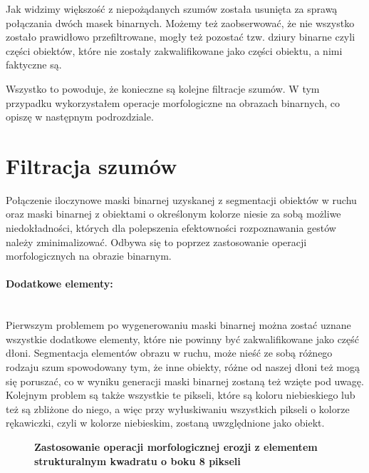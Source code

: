 \documentclass[a4paper,12pt,twoside,openany]{report}
\newcommand{\ImgPath}{.}
\begin{document}
Jak widzimy większość z niepożądanych szumów została usunięta za sprawą połączania dwóch masek binarnych. Możemy też zaobserwować, że nie wszystko zostało prawidłowo przefiltrowane, mogły też pozostać tzw. dziury binarne czyli części obiektów, które nie zostały zakwalifikowane jako części obiektu, a nimi faktyczne są. 

Wszystko to powoduje, że konieczne są kolejne filtracje szumów. W tym przypadku wykorzystałem operacje morfologiczne na obrazach binarnych, co opiszę w następnym podrozdziale.  

\section{Filtracja szumów}
Połączenie iloczynowe maski binarnej uzyskanej z segmentacji obiektów w ruchu oraz maski binarnej z obiektami o określonym kolorze niesie za sobą możliwe niedokładności, których dla polepszenia efektowności rozpoznawania gestów należy zminimalizować. Odbywa się to poprzez zastosowanie operacji morfologicznych na obrazie binarnym. 

\paragraph{Dodatkowe elementy:} \mbox{} \\
Pierwszym problemem po wygenerowaniu maski binarnej można zostać uznane wszystkie dodatkowe elementy, które nie powinny być zakwalifikowane jako część dłoni. Segmentacja elementów obrazu w ruchu, może nieść ze sobą różnego rodzaju szum spowodowany tym, że inne obiekty, różne od naszej dłoni też mogą się poruszać, co w wyniku generacji maski binarnej zostaną też wzięte pod uwagę. Kolejnym problem są także wszystkie te pikseli, które są koloru niebieskiego lub też są zbliżone do niego, a więc przy wyłuskiwaniu wszystkich pikseli o kolorze rękawiczki, czyli w kolorze niebieskim, zostaną uwzględnione jako obiekt.

\begin{figure}[H]
	\centering
	\caption{  \textbf{Zastosowanie operacji morfologicznej erozji z elementem strukturalnym kwadratu o boku 8 pikseli}}
\end{figure}
\end{document}
